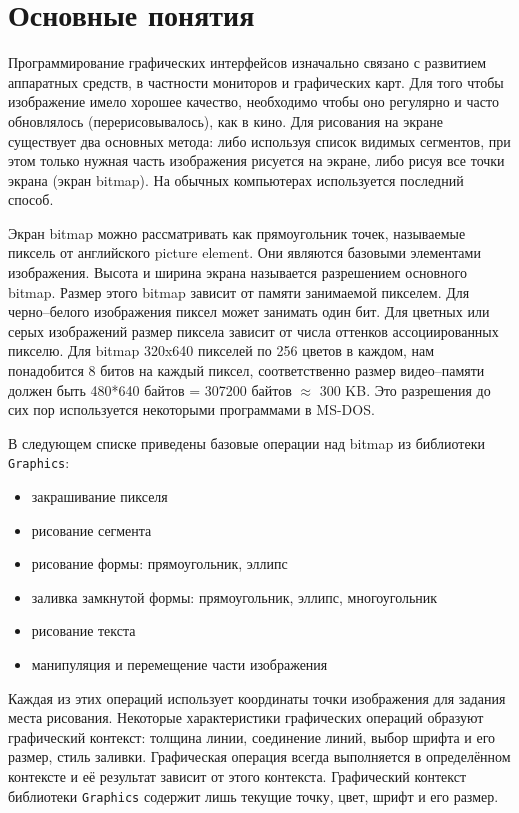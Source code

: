 \section{Основные понятия}
\label{sec:basic_notions}

Программирование графических интерфейсов изначально связано с развитием
аппаратных средств, в частности мониторов и графических карт. Для того чтобы
изображение имело хорошее качество, необходимо чтобы оно регулярно и часто
обновлялось (перерисовывалось), как в кино. Для рисования на экране существует
два основных метода: либо используя список видимых сегментов, при этом только
нужная часть изображения рисуется на экране, либо рисуя все точки экрана (экран
bitmap). На обычных компьютерах используется последний способ.

Экран bitmap можно рассматривать как прямоугольник точек, называемые пиксель от
английского picture element. Они являются базовыми элементами изображения.
Высота и ширина экрана называется разрешением основного bitmap. Размер этого
bitmap зависит от памяти занимаемой пикселем. Для черно–белого изображения
пиксел может занимать один бит. Для цветных или серых изображений размер пиксела
зависит от числа оттенков ассоциированных пикселю. Для bitmap 320x640 пикселей
по 256 цветов в каждом, нам понадобится 8 битов на каждый пиксел, соответственно
размер видео–памяти должен быть 480*640 байтов = 307200 байтов $\approx$ 300 KB.
Это разрешения до сих пор используется некоторыми программами в MS-DOS.

В следующем списке приведены базовые операции над bitmap из библиотеки
\texttt{Graphics}:

\begin{itemize}
	\item закрашивание пикселя
	
	\item рисование сегмента
	
	\item рисование формы: прямоугольник, эллипс
	
	\item заливка замкнутой формы: прямоугольник, эллипс, многоугольник
	
	\item рисование текста
	
	\item манипуляция и перемещение части изображения 
\end{itemize}

Каждая из этих операций использует координаты точки изображения для задания
места рисования. Некоторые характеристики графических операций образуют
графический контекст: толщина линии, соединение линий, выбор шрифта и его
размер, стиль заливки. Графическая операция всегда выполняется в определённом
контексте и её результат зависит от этого контекста. Графический контекст
библиотеки \texttt{Graphics} содержит лишь текущие точку, цвет, шрифт и его
размер.